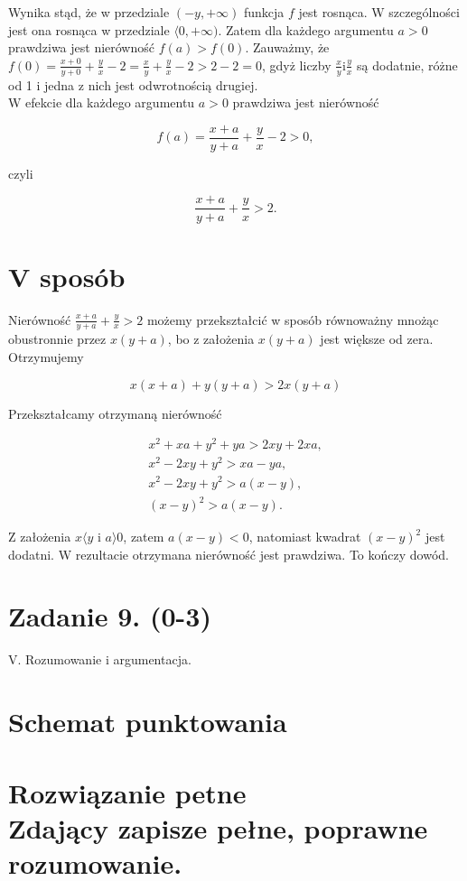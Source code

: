 \documentclass[10pt]{article}
\begin{document}
Wynika stąd, że w przedziale $(-y,+\infty)$ funkcja $f$ jest rosnąca. W szczególności jest ona rosnąca w przedziale $\langle 0,+\infty)$. Zatem dla każdego argumentu $a>0$ prawdziwa jest nierówność $f(a)>f(0)$. Zauważmy, że $f(0)=\frac{x+0}{y+0}+\frac{y}{x}-2=\frac{x}{y}+\frac{y}{x}-2>2-2=0$, gdyż liczby $\frac{x}{y} \mathrm{i} \frac{y}{x}$ są dodatnie, różne od 1 i jedna z nich jest odwrotnością drugiej.\\
W efekcie dla każdego argumentu $a>0$ prawdziwa jest nierówność

$$
f(a)=\frac{x+a}{y+a}+\frac{y}{x}-2>0,
$$

czyli

$$
\frac{x+a}{y+a}+\frac{y}{x}>2 .
$$

\section*{V sposób}
Nierówność $\frac{x+a}{y+a}+\frac{y}{x}>2$ możemy przekształcić w sposób równoważny mnożąc obustronnie przez $x(y+a)$, bo z założenia $x(y+a)$ jest większe od zera. Otrzymujemy

$$
x(x+a)+y(y+a)>2 x(y+a)
$$

Przekształcamy otrzymaną nierówność

$$
\begin{gathered}
x^{2}+x a+y^{2}+y a>2 x y+2 x a, \\
x^{2}-2 x y+y^{2}>x a-y a, \\
x^{2}-2 x y+y^{2}>a(x-y), \\
(x-y)^{2}>a(x-y) .
\end{gathered}
$$

Z założenia $x\langle y$ i $a\rangle 0$, zatem $a(x-y)<0$, natomiast kwadrat $(x-y)^{2}$ jest dodatni. W rezultacie otrzymana nierówność jest prawdziwa. To kończy dowód.

\section*{Zadanie 9. (0-3)}
V. Rozumowanie i argumentacja.

\section*{Schemat punktowania}
\section*{Rozwiązanie petne \\
 Zdający zapisze pełne, poprawne rozumowanie.}
\end{document}
